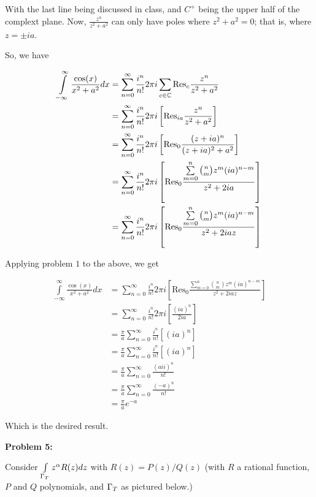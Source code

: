 \documentclass[a4paper,12pt]{article}
\begin{document}
With the last line being discussed in class, and $C^+$ being the upper half of the complext plane. Now, $\frac{z^n}{z^2 + a^2}$ can only have poles where $z^2 + a^2 = 0$; that is, where $z= \pm i a$.

So, we have 

\begin{align*}
\int\limits_{-\infty}^\infty \frac{\cos(x)}{x^2+a^2} dx &= \sum\limits_{n=0}^\infty \frac{i^n}{n!} 2\pi i \sum\limits_{c \in \mathbb{C}} \text{Res}_c \frac{z^n}{z^2+a^2}\\
&= \sum\limits_{n=0}^\infty \frac{i^n}{n!} 2\pi i \left[ \text{Res}_{ia} \frac{z^n}{z^2+a^2}\right]\\
&= \sum\limits_{n=0}^\infty \frac{i^n}{n!} 2\pi i \left[ \text{Res}_0 \frac{(z+ia)^n}{(z+ia)^2+a^2} \right]\\
&= \sum\limits_{n=0}^\infty \frac{i^n}{n!} 2\pi i \left[ \text{Res}_0 \frac{\sum\limits_{m=0}^n \binom{n}{m} z^m (ia)^{n-m}}{z^2 + 2ia} \right]\\
&= \sum\limits_{n=0}^\infty \frac{i^n}{n!} 2\pi i \left[ \text{Res}_0 \frac{\sum\limits_{m=0}^n \binom{n}{m} z^m (ia)^{n-m}}{z^2 + 2iaz} \right]\\
\end{align*}

Applying problem $1$ to the above, we get

\begin{align*}
\int\limits_{-\infty}^\infty \frac{\cos(x)}{x^2+a^2} dx &=\sum\limits_{n=0}^\infty \frac{i^n}{n!} 2\pi i \left[ \text{Res}_0 \frac{\sum\limits_{m=0}^n \binom{n}{m} z^m (ia)^{n-m}}{z^2 + 2iaz} \right]\\
&= \sum\limits_{n=0}^\infty \frac{i^n}{n!} 2\pi i \left[ \frac{ (ia)^{n}}{2ia} \right]\\
&= \frac{\pi}{a} \sum\limits_{n=0}^\infty \frac{i^n}{n!}  \left[ (ia)^{n}\right]\\
&= \frac{\pi}{a} \sum\limits_{n=0}^\infty \frac{i^n}{n!}  \left[(ia)^{n} \right]\\
&= \frac{\pi}{a} \sum\limits_{n=0}^\infty \frac{(aii)^n}{n!} \\
&= \frac{\pi}{a} \sum\limits_{n=0}^\infty \frac{(-a)^n}{n!}\\
&= \frac{\pi}{a} e^{-a}
\end{align*}

Which is the desired result.

\shunt

{\bf Problem 5:}

Consider $\int\limits_{\Gamma_T} z^\alpha R(z) dz$ with $R(z) =P(z)/Q(z)$ (with $R$ a rational function, $P$ and $Q$ polynomials, and $\Gamma_T$ as pictured below.)
\end{document}
